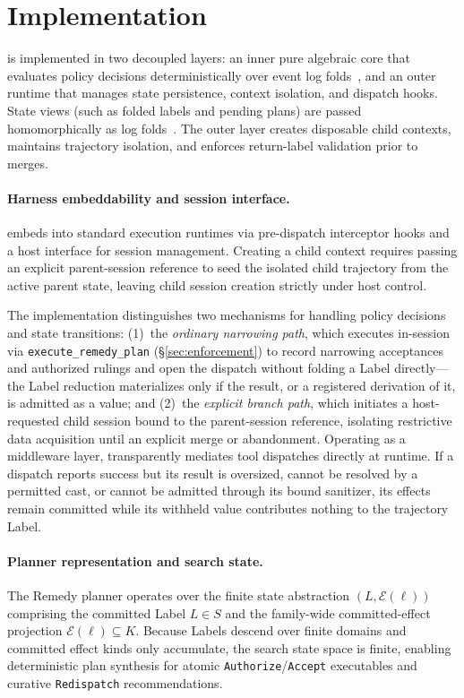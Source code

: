 \section{Implementation}\label{sec:implementation}

\appa{} is implemented in two decoupled layers: an inner pure algebraic core that evaluates policy decisions deterministically over event log folds~\cite{schneider2000enforceable,wangAgentTracesTrust2026}, and an outer runtime that manages state persistence, context isolation, and dispatch hooks. State views (such as folded labels and pending plans) are passed homomorphically as log folds~\cite{pierce2002types}. The outer layer creates disposable child contexts, maintains trajectory isolation, and enforces return-label validation prior to merges.

\paragraph{Harness embeddability and session interface.}
\appa{} embeds into standard execution runtimes via pre-dispatch interceptor hooks and a host interface for session management. Creating a child context requires passing an explicit parent-session reference to seed the isolated child trajectory from the active parent state, leaving child session creation strictly under host control.

The implementation distinguishes two mechanisms for handling policy decisions and state transitions: (1)~the \emph{ordinary narrowing path}, which executes in-session via \texttt{execute\_remedy\_plan} (\S\ref{sec:enforcement}) to record narrowing acceptances and authorized rulings and open the dispatch without folding a Label directly—the Label reduction materializes only if the result, or a registered derivation of it, is admitted as a value; and (2)~the \emph{explicit branch path}, which initiates a host-requested child session bound to the parent-session reference, isolating restrictive data acquisition until an explicit merge or abandonment. Operating as a middleware layer, \appa{} transparently mediates tool dispatches directly at runtime. If a dispatch reports success but its result is oversized, cannot be resolved by a permitted cast, or cannot be admitted through its bound sanitizer, its effects remain committed while its withheld value contributes nothing to the trajectory Label.

\paragraph{Planner representation and search state.}
The Remedy planner operates over the finite state abstraction $(L, \mathcal{E}(\ell))$ comprising the committed Label $L \in S$ and the family-wide committed-effect projection $\mathcal{E}(\ell) \subseteq K$. Because Labels descend over finite domains and committed effect kinds only accumulate, the search state space is finite, enabling deterministic plan synthesis for atomic \texttt{Authorize}/\texttt{Accept} executables and curative \texttt{Redispatch} recommendations.


